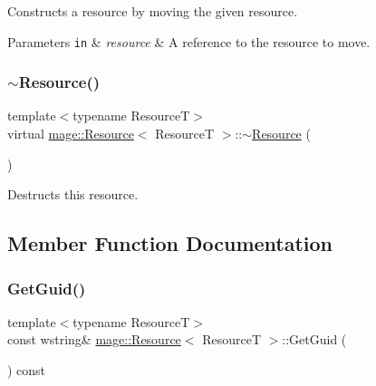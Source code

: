 Constructs a resource by moving the given resource.


\begin{DoxyParams}[1]{Parameters}
\mbox{\tt in}  & {\em resource} & A reference to the resource to move. \\
\hline
\end{DoxyParams}
\mbox{\label{classmage_1_1_resource_a56a3ac799224e100b271b65ec455b59e}} 
\subsubsection{\texorpdfstring{$\sim$\+Resource()}{~Resource()}}
{\footnotesize\ttfamily template$<$typename ResourceT$>$ \\
virtual \mbox{\hyperlink{classmage_1_1_resource}{mage\+::\+Resource}}$<$ ResourceT $>$\+::$\sim$\mbox{\hyperlink{classmage_1_1_resource}{Resource}} (\begin{DoxyParamCaption}{ }\end{DoxyParamCaption})\hspace{0.3cm}{\ttfamily [virtual]}}

Destructs this resource. 

\subsection{Member Function Documentation}
\mbox{\label{classmage_1_1_resource_adaa2464cb1fdb51a3f6028c0f316d083}} 
\subsubsection{\texorpdfstring{Get\+Guid()}{GetGuid()}}
{\footnotesize\ttfamily template$<$typename ResourceT$>$ \\
const wstring\& \mbox{\hyperlink{classmage_1_1_resource}{mage\+::\+Resource}}$<$ ResourceT $>$\+::Get\+Guid (\begin{DoxyParamCaption}{ }\end{DoxyParamCaption}) const\hspace{0.3cm}{\ttfamily [noexcept]}}

